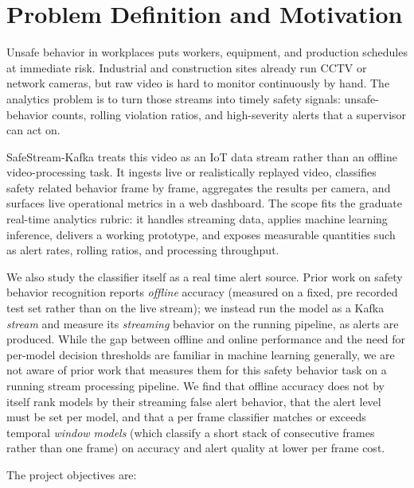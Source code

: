 \documentclass[conference]{IEEEtran}
\begin{document}
\section{Problem Definition and Motivation}
Unsafe behavior in workplaces puts workers, equipment, and production schedules at immediate risk. Industrial and construction sites already run CCTV or network cameras, but raw video is hard to monitor continuously by hand. The analytics problem is to turn those streams into timely safety signals: unsafe-behavior counts, rolling violation ratios, and high-severity alerts that a supervisor can act on.

SafeStream-Kafka treats this video as an IoT data stream rather than an offline video-processing task. It ingests live or realistically replayed video, classifies safety related behavior frame by frame, aggregates the results per camera, and surfaces live operational metrics in a web dashboard. The scope fits the graduate real-time analytics rubric: it handles streaming data, applies machine learning inference, delivers a working prototype, and exposes measurable quantities such as alert rates, rolling ratios, and processing throughput.

We also study the classifier itself as a real time alert source. Prior work on safety behavior recognition reports \emph{offline} accuracy (measured on a fixed, pre recorded test set rather than on the live stream); we instead run the model as a Kafka \emph{stream} and measure its \emph{streaming} behavior on the running pipeline, as alerts are produced. While the gap between offline and online performance and the need for per-model decision thresholds are familiar in machine learning generally, we are not aware of prior work that measures them for this safety behavior task on a running stream processing pipeline. We find that offline accuracy does not by itself rank models by their streaming false alert behavior, that the alert level must be set per model, and that a per frame classifier matches or exceeds temporal \emph{window models} (which classify a short stack of consecutive frames rather than one frame) on accuracy and alert quality at lower per frame cost.

The project objectives are:
\end{document}

